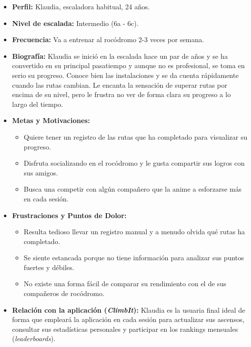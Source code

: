 \begin{itemize}
    \item \textbf{Perfil:} Klaudia, escaladora habitual, 24 años.
    \item \textbf{Nivel de escalada:} Intermedio (6a - 6c).
    \item \textbf{Frecuencia:} Va a entrenar al rocódromo 2-3 veces por semana.
    \item \textbf{Biografía:} Klaudia se inició en la escalada hace un par de años y se ha convertido en su principal pasatiempo y aunque no es profesional, se toma en serio su progreso. Conoce bien las instalaciones y se da cuenta rápidamente cuando las rutas cambian. Le encanta la sensación de superar rutas por encima de su nivel, pero le frustra no ver de forma clara su progreso a lo largo del tiempo.
    \item \textbf{Metas y Motivaciones:}
    \begin{itemize}
        \item Quiere tener un registro de las rutas que ha completado para visualizar su progreso.
        \item Disfruta socializando en el rocódromo y le gusta compartir sus logros con sus amigos.
        \item Busca una competir con algún compañero que la anime a esforzarse más en cada sesión.

    \end{itemize}

    \item \textbf{Frustraciones y Puntos de Dolor:}
    \begin{itemize}
        \item Resulta tedioso llevar un registro manual y a menudo olvida qué rutas ha completado.
        \item Se siente estancada porque no tiene información para analizar sus puntos fuertes y débiles.
        \item No existe una forma fácil de comparar su rendimiento con el de sus compañeros de rocódromo.
    \end{itemize}

    \item \textbf{Relación con la aplicación (\textit{ClimbIt}):} Klaudia es la usuaria final ideal de forma que empleará la aplicación en cada sesión para actualizar sus ascensos, consultar sus estadísticas personales y participar en los rankings mensuales (\textit{leaderboards}).
\end{itemize}

